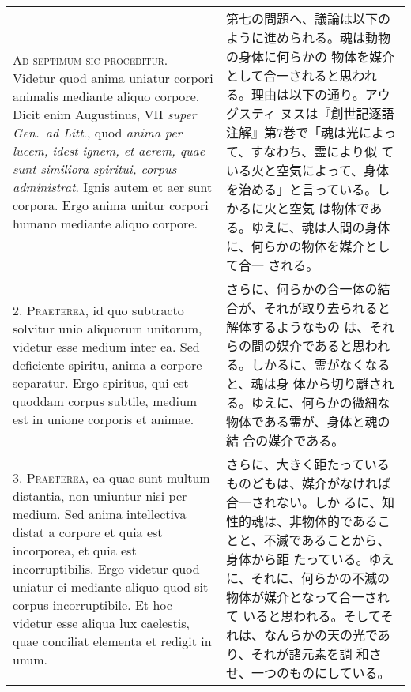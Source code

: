 \documentclass[paper=a4paper,fontsize=10pt,jafontsize=9pt,titlepage]{jlreq}
\begin{document}
\begin{longtable}{p{21em}p{21em}}
{\scshape Ad septimum sic proceditur}. Videtur quod anima uniatur
corpori animalis mediante aliquo corpore. Dicit enim Augustinus, VII
{\itshape super Gen.~ad Litt}., quod {\itshape anima per lucem, idest
ignem, et aerem, quae sunt similiora spiritui, corpus
administrat}. Ignis autem et aer sunt corpora. Ergo anima unitur
corpori humano mediante aliquo corpore.

&

 第七の問題へ、議論は以下のように進められる。魂は動物の身体に何らかの
 物体を媒介として合一されると思われる。理由は以下の通り。アウグスティ
 ヌスは『創世記逐語注解』第7巻で「魂は光によって、すなわち、霊により似
 ている火と空気によって、身体を治める」と言っている。しかるに火と空気
 は物体である。ゆえに、魂は人間の身体に、何らかの物体を媒介として合一
 される。


\\



2. {\scshape Praeterea}, id quo subtracto solvitur unio aliquorum
unitorum, videtur esse medium inter ea. Sed deficiente spiritu, anima
a corpore separatur. Ergo spiritus, qui est quoddam corpus subtile,
medium est in unione corporis et animae.

&

さらに、何らかの合一体の結合が、それが取り去られると解体するようなもの
は、それらの間の媒介であると思われる。しかるに、霊がなくなると、魂は身
体から切り離される。ゆえに、何らかの微細な物体である霊が、身体と魂の結
合の媒介である。

\\



3. {\scshape Praeterea}, ea quae sunt multum distantia, non uniuntur
nisi per medium. Sed anima intellectiva distat a corpore et quia est
incorporea, et quia est incorruptibilis. Ergo videtur quod uniatur ei
mediante aliquo quod sit corpus incorruptibile. Et hoc videtur esse
aliqua lux caelestis, quae conciliat elementa et redigit in unum.

&

さらに、大きく距たっているものどもは、媒介がなければ合一されない。しか
るに、知性的魂は、非物体的であることと、不滅であることから、身体から距
たっている。ゆえに、それに、何らかの不滅の物体が媒介となって合一されて
いると思われる。そしてそれは、なんらかの天の光であり、それが諸元素を調
和させ、一つのものにしている。

\\




\end{longtable}
\end{document}
